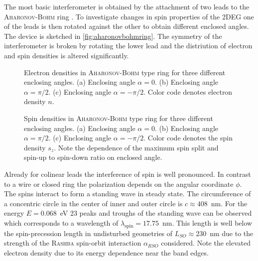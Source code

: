 The most basic interferometer is obtained by the attachment of two leads to the \textsc{Aharonov-Bohm} ring \cite{PhysRevLett.79.273}. To investigate changes in spin properties of the 2DEG one of the leads is then rotated against the other to obtain different enclosed angles. The device is sketched in \cref{fig:aharonovbohmring}. The symmetry of the interferometer is broken by rotating the lower lead and the distriution of electron and spin densities is altered significantly.\par
\begin{figure}[h!]
  \caption{Electron densities in \textsc{Aharonov-Bohm} type ring for three different enclosing angles. (a) Enclosing angle $\alpha=0$. (b) Enclosing angle $\alpha=\pi/2$. (c) Enclosing angle $\alpha=-\pi/2$. Color code denotes electron density $n$.} 
\end{figure}
\begin{figure}[h!]
  \caption{Spin densities in \textsc{Aharonov-Bohm} type ring for three different enclosing angles. (a) Enclosing angle $\alpha=0$. (b) Enclosing angle $\alpha=\pi/2$. (c) Enclosing angle $\alpha=-\pi/2$. Color code denotes the spin density $s_z$. Note the dependence of the maximum spin split and spin-up to spin-down ratio on enclosed angle.}
\end{figure}
Already for colinear leads the interference of spin is well pronounced. In contrast to a wire or closed ring \cite{PhysRevB.82.165322} the polarization depends on the angular coordinate $\phi$.
The spins interact to form a standing wave in steady state. The circumference of a concentric circle in the center of inner and outer circle is $c\approx 408$~nm. For the energy $E=0.068$~eV 23 peaks and troughs of the standing wave can be observed which corresponds to a wavelength of $\lambda_{\text{spin}}=17.75$~nm. This length is well below the spin-precession length in undisturbed geometries of $L_{SO}\approx230$~nm due to the strength of the \textsc{Rashba} spin-orbit interaction $\alpha_{RSO}$ considered. Note the elevated electron density due to its energy dependence near the band edges.\par
